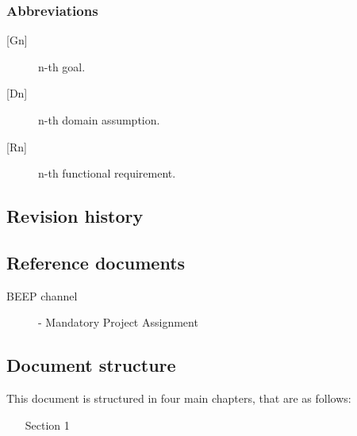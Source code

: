 \subsubsection{Abbreviations}

\begin{description}
    \item [{[Gn]}] n-th goal.
    \item [{[Dn]}] n-th domain assumption.
    \item [{[Rn]}] n-th functional requirement.
\end{description}

\subsection{Revision history}

\subsection{Reference documents}

\begin{description}
    \item [BEEP channel] - Mandatory Project Assignment
\end{description}


\subsection{Document structure}
This document is structured in four main chapters, that are as follows:
\begin{enumerate}
    \item[Section 1]
\end{enumerate}
